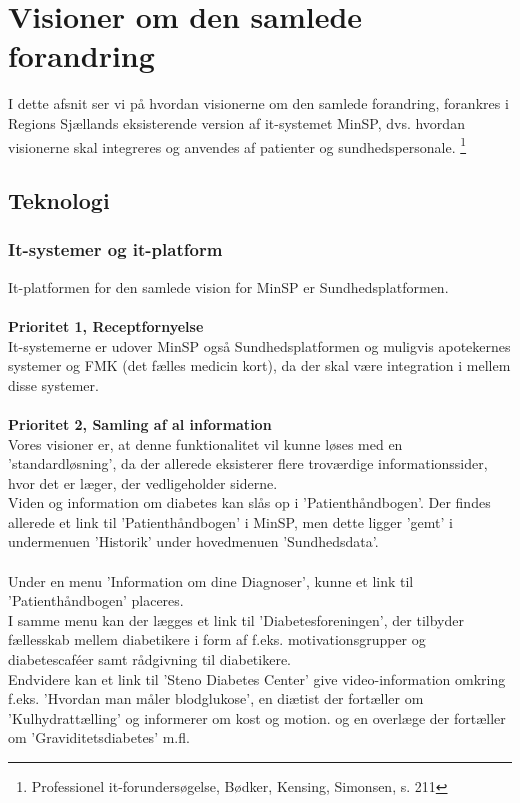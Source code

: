 \section{Visioner om den samlede forandring}
I dette afsnit ser vi på hvordan visionerne om den samlede forandring, forankres i Regions Sjællands eksisterende version af it-systemet MinSP, dvs. hvordan visionerne skal integreres og anvendes af patienter og sundhedspersonale. \footnote{Professionel it-forundersøgelse, Bødker, Kensing, Simonsen, s. 211} 
\subsection{Teknologi}
%
%
\subsubsection{It-systemer og it-platform}
It-platformen for den samlede vision for MinSP er Sundhedsplatformen.
\\\\
\textbf{Prioritet 1, Receptfornyelse} \\
It-systemerne er udover MinSP også Sundhedsplatformen og muligvis apotekernes systemer og FMK (det fælles medicin kort), da der skal være integration i mellem disse systemer.
\\\\
\textbf{Prioritet 2, Samling af al information} \\
%
%
Vores visioner er, at denne funktionalitet vil kunne løses med en 'standardløsning', da der allerede eksisterer flere troværdige informationssider, hvor det er læger, der vedligeholder siderne. \\
Viden og information om diabetes kan slås op i 'Patienthåndbogen'. Der findes allerede et link til 'Patienthåndbogen' i MinSP, men dette ligger 'gemt' i undermenuen 'Historik' under hovedmenuen 'Sundhedsdata'.
\\ \\
Under en menu 'Information om dine Diagnoser', kunne et link til 'Patienthåndbogen' placeres. \\
I samme menu kan der lægges et link til 'Diabetesforeningen', der tilbyder fællesskab mellem diabetikere i form af f.eks. motivationsgrupper og diabetescaféer samt rådgivning til diabetikere.
\\
Endvidere kan et link til 'Steno Diabetes Center' give video-information omkring f.eks. 'Hvordan man måler blodglukose', en diætist der fortæller om 'Kulhydrattælling' og informerer om kost og motion. og en overlæge der fortæller om 'Graviditetsdiabetes' m.fl. \\
